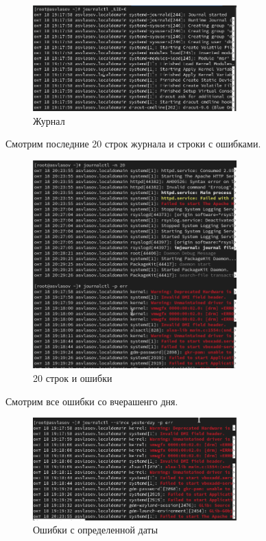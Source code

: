 \documentclass[
  12pt,
  a4paper,
  DIV=11,
  numbers=noendperiod]{scrreprt}
\begin{document}
\begin{figure}

{\centering \includegraphics[width=0.7\textwidth,height=\textheight]{image/11.png}

}

\caption{Журнал}

\end{figure}%

Смотрим последние 20 строк журнала и строки с ошибками.

\begin{figure}

{\centering \includegraphics[width=0.7\textwidth,height=\textheight]{image/12.png}

}

\caption{20 строк и ошибки}

\end{figure}%

Смотрим все ошибки со вчерашенго дня.

\begin{figure}

{\centering \includegraphics[width=0.7\textwidth,height=\textheight]{image/13.png}

}

\caption{Ошибки с определенной даты}

\end{figure}%
\end{document}
